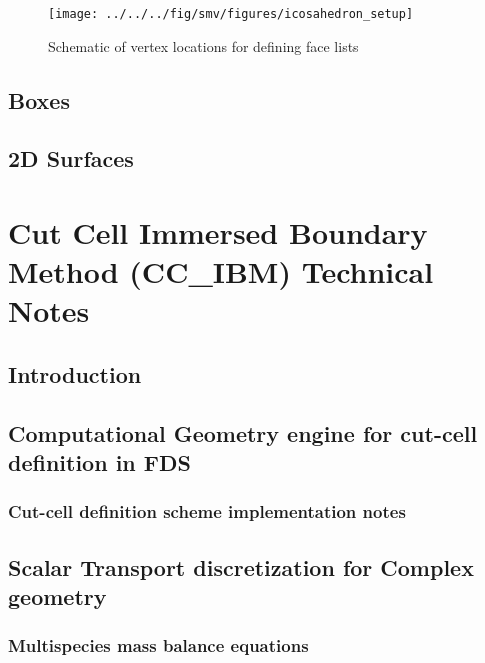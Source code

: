 \documentclass[12pt]{article}
\begin{document}
\begin{figure}
\begin{center}
\texttt{[image: ../../../fig/smv/figures/icosahedron\_setup]}
\end{center}
\caption{Schematic of vertex locations for defining face lists}
\label{figure:facelist}
\end{figure}

\subsection{Boxes}
\subsection{2D Surfaces}


\clearpage

\section{Cut Cell Immersed Boundary Method (CC\_IBM) Technical Notes}


\subsection{Introduction}


\subsection{Computational Geometry engine for cut-cell definition in FDS}


\subsubsection{Cut-cell definition scheme implementation notes}


\subsection{Scalar Transport discretization for Complex geometry}


\subsubsection{Multispecies mass balance equations}
\end{document}
